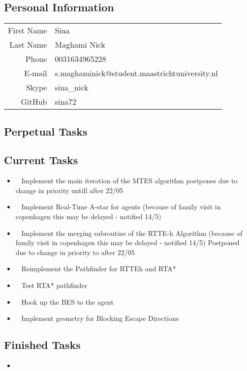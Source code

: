 \subsection{Personal Information}
\begin{table}[h!]
	\begin{tabular}{rl}
	First Name 	& Sina\\
	Last Name	& Maghami Nick\\
	Phone		& 0031634965228\\
	E-mail		& s.maghaminick@student.maastrichtuniversity.nl\\
	Skype		& sina\_nick\\
	GitHub		& sina72
\end{tabular}
\end{table}

\subsection{Perpetual Tasks}

\subsection{Current Tasks}
\begin{itemize}
	\item~
	Implement the main iteration of the MTES algorithm
		\subitem postpones due to change in priority untill after 22/05
	\item~
	Implement Real-Time A-star for agents
		\subitem (because of family visit in copenhagen this may be delayed - notified 14/5)
	\item~
	Implement the merging subroutine of the RTTE-h Algorithm
		\subitem (because of family visit in copenhagen this may be delayed - notified 14/5)
		\subitem Postponed due to change in priority to after 22/05
	\item~
		Reimplement the Pathfinder for RTTEh and RTA*
	\item~
		Test RTA* pathfinder
	\item~
		Hook up the BES to the agent
	\item~
	Implement geometry for Blocking Escape Directions
\end{itemize}

\subsection{Finished Tasks}
\begin{itemize}
	\item 
\end{itemize}
